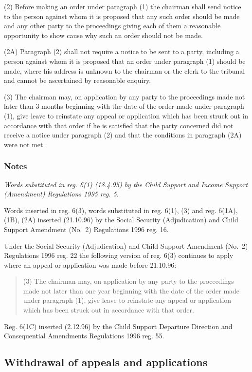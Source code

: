 \documentclass[a4paper]{article}
\newcommand\amendment[1]{\subsubsection*{Notes}{\itshape\frenchspacing\footnotesize #1 \par}}
\begin{document}
(2) Before making an order under paragraph (1) the chairman shall send notice to the person against whom it is proposed that any such order should be made and any other party to the proceedings giving each of them a reasonable opportunity to show cause why such an order should not be made.

(2A) Paragraph (2) shall not require a notice to be sent to a party, including a person against whom it is proposed that an order under paragraph (1) should be made, where his address is unknown to the chairman or the clerk to the tribunal and cannot be ascertained by reasonable enquiry.

(3) The chairman may, on application by any party to the proceedings made not later than 
3 months  %
beginning with the date of the order made under paragraph (1), give leave to reinstate any appeal or application which has been struck out in accordance with that order
if he is satisfied that the party concerned did not receive a notice under paragraph (2) and that the conditions in paragraph (2A) were not met.  %

\amendment{
Words substituted in reg. 6(1) (18.4.95) by the Child Support and Income Support (Amendment) Regulations 1995 reg. 5.

Words inserted in reg. 6(3), words substituted in reg. 6(1), (3) and reg. 6(1A), (1B), (2A) inserted (21.10.96) by the Social Security (Adjudication) and Child Support Amendment (No.\ 2) Regulations 1996 reg. 16.

Under the Social Security (Adjudication) and Child Support Amendment (No.\ 2) Regulations 1996 reg. 22 the following version of reg. 6(3) continues to apply where an appeal or application was made before 21.10.96:
\begin{quotation}
(3) The chairman may, on application by any party to the proceedings made not later than one year beginning with the date of the order made under paragraph (1), give leave to reinstate any appeal or application which has been struck out in accordance with that order.
\end{quotation}

Reg. 6(1C) inserted (2.12.96) by the Child Support Departure Direction and Consequential Amendments Regulations 1996 reg. 55.
}

\subsection[7. Withdrawal of appeals and applications]{Withdrawal of appeals and applications}
\end{document}
